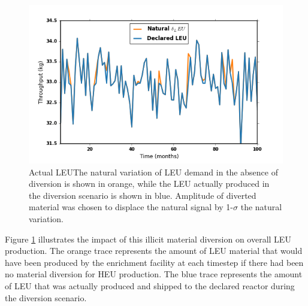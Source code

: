 \begin{figure}
\begin{center}
\includegraphics[natwidth=162bp,natheight=227bp, scale=0.7]{./figs/nat_delta_R5.png}
\end{center}
\caption{Actual \gls{LEU}The natural variation of \gls{LEU} demand in the absence of diversion is shown in orange, while the \gls{LEU} actually produced in the diversion scenario is shown in blue. Amplitude of diverted material was chosen to displace the natural signal by 1-$\sigma$ the natural variation.}
\label{fig:leu_produced}
\end{figure}

Figure \ref{fig:leu_produced} illustrates the impact of this illicit material diversion on overall \gls{LEU} production.  The orange trace represents the amount of \gls{LEU} material that would have been produced by the enrichment facility at each timestep if there had been no material diversion for \gls{HEU} production.  The blue trace represents the amount of \gls{LEU} that was actually produced and shipped to the declared reactor during the diversion scenario.

